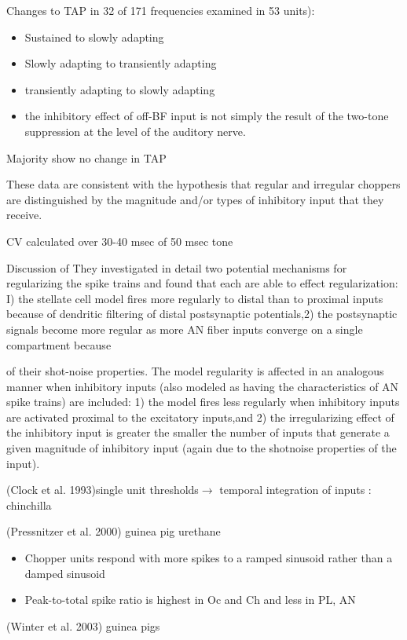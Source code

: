 \documentclass[10pt,a4paper]{article}
\begin{document}
Changes to TAP in 32 of 171 frequencies examined in 53 units):


\begin{itemize}
\item Sustained to slowly adapting
\item Slowly adapting to transiently adapting
\item transiently adapting to slowly adapting
\item the inhibitory effect of off-BF input is not simply the result of the
  two-tone suppression at the level of the auditory nerve.
\end{itemize}
Majority show no change in TAP

These data are consistent with the hypothesis that regular and irregular
choppers are distinguished by the magnitude and/or types of inhibitory input
that they receive.

CV calculated over 30-40 msec of 50 msec tone

Discussion of \citep{BanksSachs:1991} They investigated in detail two potential
mechanisms for regularizing the spike trains and found that each are able to
effect regularization: I) the stellate cell model fires more regularly to distal
than to proximal inputs because of dendritic filtering of distal postsynaptic
potentials,2) the postsynaptic signals become more regular as more AN fiber
inputs converge on a single compartment because

of their shot-noise properties. The model regularity is affected in an analogous
manner when inhibitory inputs (also modeled as having the characteristics of AN
spike trains) are included: 1) the model fires less regularly when inhibitory
inputs are activated proximal to the excitatory inputs,and 2) the irregularizing
effect of the inhibitory input is greater the smaller the number of inputs that
generate a given magnitude of inhibitory input (again due to the shotnoise
properties of the input).

(Clock et al. 1993)single unit thresholds\ensuremath{\rightarrow} temporal
integration of inputs : chinchilla

(Pressnitzer et al. 2000) guinea pig urethane


\begin{itemize}
\item Chopper units respond with more spikes to a ramped sinusoid rather than a
  damped sinusoid
\item Peak-to-total spike ratio is highest in Oc and Ch and less in PL, AN
\end{itemize}
(Winter et al. 2003) guinea pigs
\end{document}
